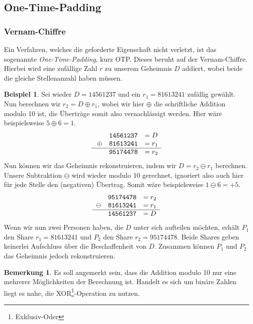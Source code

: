\documentclass[12pt, a4paper, oneside, titlepage]{report}
\theoremstyle{definition}
\newtheorem{bem}[lemma]{Bemerkung}
\newtheorem{bsp}[lemma]{Beispiel}
\begin{document}
	\subsection{One-Time-Padding}
	\subsubsection{Vernam-Chiffre}
		 Ein Verfahren, welches die geforderte Eigenschaft nicht verletzt, ist das sogenannte \emph{One-Time-Padding}, kurz OTP. Dieses beruht auf der Vernam-Chiffre. Hierbei wird eine zufällige Zahl $ r $ zu unserem Geheimnis $ D $  addiert, wobei beide die gleiche Stellenanzahl haben müssen. \cite{cobbe}
	
	\begin{bsp}
	Sei wieder $ D = 14561237 $ und ein $ r_1 = 81613241 $ zufällig gewählt. Nun berechnen wir $ r_2 = D \oplus r_1 $, wobei wir hier $ \oplus $ die schriftliche Addition modulo 10 ist, die Überträge somit also vernachlässigt werden. Hier wäre beispielsweise $ 5 \oplus 6 = 1 $.
	$$\begin{array}{ccl}
 	 & \mathtt{14561237} & = D \\\
	\oplus & \mathtt{81613241} & = r_1 \\\hline
 	 & \mathtt{95174478} & = r_2 
	\end{array}$$
	Nun können wir das Geheimnis rekonstruieren, indem wir $ D = r_2 \ominus r_1 $  berechnen. Unsere Subtraktion $ \ominus $ wird wieder modulo 10 gerechnet, ignoriert also auch hier für jede Stelle den (negativen) Übertrag. Somit wäre beispielsweise $ 1 \ominus 6 = + 5 $.
	$$\begin{array}{ccl}
	 & \mathtt{95174478} & = r_2 \\
	\ominus & \mathtt{81613241} & = r_1 \\\hline
	 & \mathtt{14561237} & = D
	\end{array}$$
	Wenn wir nun zwei Personen haben, die $ D $ unter sich aufteilen möchten, erhält $ P_1 $ den Share $ r_1 = 81613241 $ und $ P_2 $ den Share $ r_2 = 95174478$. Beide Shares geben keinerlei Aufschluss über die Beschaffenheit von $ D $. Zusammen können $ P_1 $ und $ P_2 $ das Geheimnis jedoch rekonstruieren.
	\end{bsp}

	\begin{bem}
		Es soll angemerkt sein, dass die Addition modulo 10 nur eine mehrerer Möglichkeiten der Berechnung ist. Handelt es sich um binäre Zahlen liegt es nahe, die XOR\footnote{Exklusiv-Oder}-Operation zu nutzen.
	\end{bem}
	
\end{document}

